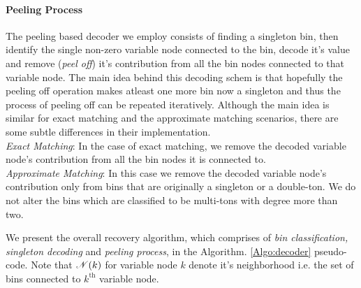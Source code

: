 \documentclass[journal,11pt,onecolumn]{IEEEtran}  %
\begin{document}
\paragraph*{Peeling Process} The peeling based decoder we employ consists of finding a singleton bin, then identify the single non-zero variable node connected to the bin, decode it's value and remove ({\it peel off}) it's contribution from all the bin nodes connected to that variable node. The main idea behind this decoding schem is that hopefully the peeling off operation makes atleast one more bin now a singleton and thus the process of peeling off can be repeated iteratively. Although the main idea is similar for exact matching and the approximate matching scenarios, there are some subtle differences in their implementation.\\
{\it Exact Matching}: In the case of exact matching, we remove the decoded variable node's contribution from all the bin nodes it is connected to.\\
{\it Approximate Matching}: In this case we remove the decoded variable node's contribution only from bins that are originally a singleton or a double-ton. We do not alter the bins which are classified to be multi-tons with degree more than two.

We present the overall recovery algorithm, which comprises of {\it bin classification, singleton decoding} and {\it peeling process}, in the Algorithm. \ref{Algo:decoder} pseudo-code. Note that $\mathscr{N}(k)$ for variable node $k$ denote it's neighborhood i.e. the set of bins connected to $k^{\text{th}}$ variable node. 
\end{document}
